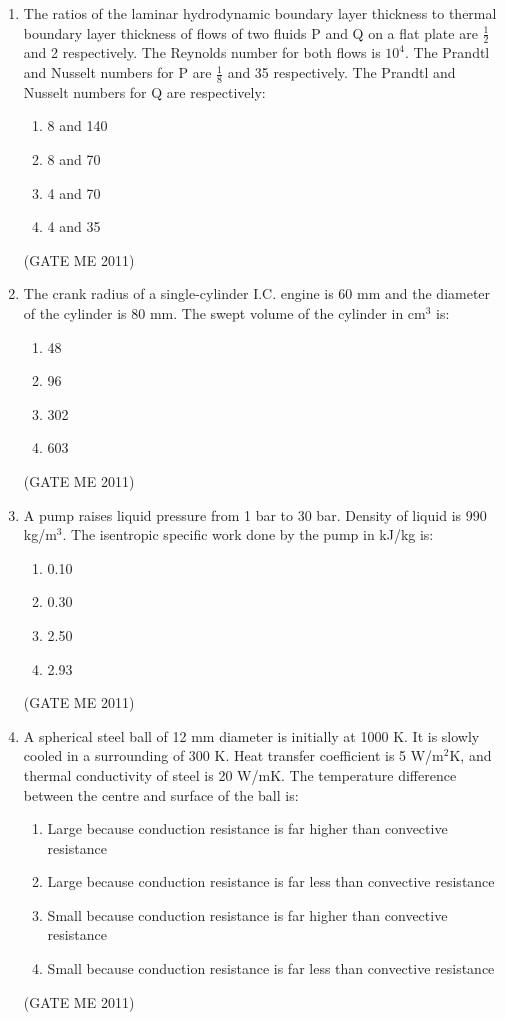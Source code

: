 \documentclass[journal]{IEEEtran}
\begin{document}
\begin{enumerate}
\item The ratios of the laminar hydrodynamic boundary layer thickness to thermal boundary layer thickness of flows of two fluids P and Q on a flat plate are $ \frac{1}{2} $ and 2 respectively. The Reynolds number for both flows is $ 10^4 $. The Prandtl and Nusselt numbers for P are $ \frac{1}{8} $ and 35 respectively. The Prandtl and Nusselt numbers for Q are respectively:
\begin{multicols}{4}
\begin{enumerate}
\item 8 and 140  
\item 8 and 70  
\item 4 and 70  
\item 4 and 35  
\end{enumerate}
\end{multicols}    
\hfill (GATE ME 2011)

\item The crank radius of a single-cylinder I.C. engine is 60 mm and the diameter of the cylinder is 80 mm. The swept volume of the cylinder in cm$^3$ is:
\begin{multicols}{4}
\begin{enumerate}
\item 48  
\item 96  
\item 302  
\item 603  
\end{enumerate}
\end{multicols}    
\hfill (GATE ME 2011)

\item A pump raises liquid pressure from 1 bar to 30 bar. Density of liquid is 990 kg/m$^3$. The isentropic specific work done by the pump in kJ/kg is:
\begin{multicols}{4}
\begin{enumerate}
\item 0.10  
\item 0.30  
\item 2.50  
\item 2.93  
\end{enumerate}
\end{multicols}    
\hfill (GATE ME 2011)

\item A spherical steel ball of 12 mm diameter is initially at 1000 K. It is slowly cooled in a surrounding of 300 K. Heat transfer coefficient is 5 W/m$^2$K, and thermal conductivity of steel is 20 W/mK. The temperature difference between the centre and surface of the ball is:
\begin{enumerate}
\item Large because conduction resistance is far higher than convective resistance  
\item Large because conduction resistance is far less than convective resistance  
\item Small because conduction resistance is far higher than convective resistance  
\item Small because conduction resistance is far less than convective resistance  
\end{enumerate}
\hfill (GATE ME 2011)


\end{enumerate}
\end{document}
